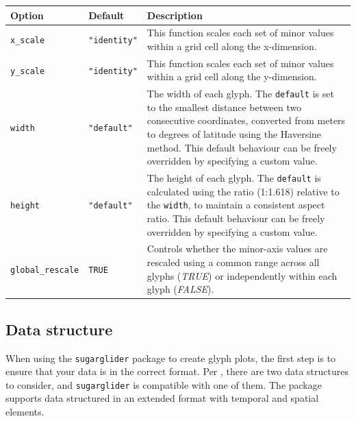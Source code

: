 {\def\LTcaptype{none} %
\begin{longtable}[]{@{}
  >{\raggedright\arraybackslash}p{}
  >{\raggedright\arraybackslash}p{}
  >{\raggedright\arraybackslash}p{}@{}}
\toprule\noalign{}
\begin{minipage}[b]{\linewidth}\raggedright
Option
\end{minipage} & \begin{minipage}[b]{\linewidth}\raggedright
Default
\end{minipage} & \begin{minipage}[b]{\linewidth}\raggedright
Description
\end{minipage} \\
\midrule\noalign{}
\endhead
\bottomrule\noalign{}
\endlastfoot
\texttt{x\_scale} & \texttt{"identity"} & This function scales each set of minor values within a grid cell along the x-dimension. \\
\texttt{y\_scale} & \texttt{"identity"} & This function scales each set of minor values within a grid cell along the y-dimension. \\
\texttt{width} & \texttt{"default"} & The width of each glyph. The \texttt{default} is set to the smallest distance between two consecutive coordinates, converted from meters to degrees of latitude using the Haversine method. This default behaviour can be freely overridden by specifying a custom value. \\
\texttt{height} & \texttt{"default"} & The height of each glyph. The \texttt{default} is calculated using the ratio (1:1.618) relative to the \texttt{width}, to maintain a consistent aspect ratio. This default behaviour can be freely overridden by specifying a custom value. \\
\texttt{global\_rescale} & \texttt{TRUE} & Controls whether the minor-axis values are rescaled using a common range across all glyphs (\emph{TRUE}) or independently within each glyph (\emph{FALSE}). \\
\end{longtable}
}

\subsection{Data structure}\label{data-structure}

When using the \texttt{sugarglider} package to create glyph plots, the first step is to ensure that your data is in the correct format. Per \citet{JSSv110i07}, there are two data structures to consider, and \texttt{sugarglider} is compatible with one of them. The package supports data structured in an extended format with temporal and spatial elements.

